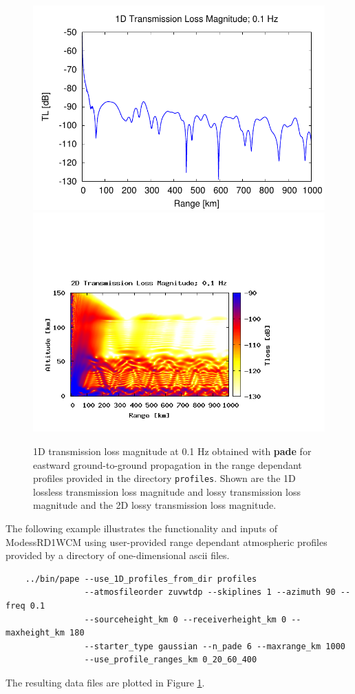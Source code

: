 \begin{figure}[h]
\begin{center}
\includegraphics[scale=0.60]{figs/pade_ex2_1d}
\includegraphics[scale=0.45,trim = 20 20 110 140,clip]{figs/pade_ex2_2d.png}
\end{center}
\caption{1D transmission loss magnitude at 0.1 Hz obtained with {\bf pade} for eastward ground-to-ground propagation in the range dependant profiles provided in the directory {\tt profiles}. Shown are the 1D lossless transmission loss magnitude and lossy transmission loss magnitude and the 2D lossy transmission loss magnitude.}
\label{fig: pade ex2}
\end{figure}

The following example illustrates the functionality and inputs of ModessRD1WCM using user-provided range dependant atmospheric profiles provided by a directory of one-dimensional ascii files. 
\begin{verbatim}
    ../bin/pape --use_1D_profiles_from_dir profiles 
                --atmosfileorder zuvwtdp --skiplines 1 --azimuth 90 --freq 0.1 
                --sourceheight_km 0 --receiverheight_km 0 --maxheight_km 180 
                --starter_type gaussian --n_pade 6 --maxrange_km 1000  
                --use_profile_ranges_km 0_20_60_400
\end{verbatim}
The resulting data files are plotted in Figure \ref{fig: pade ex2}. 


